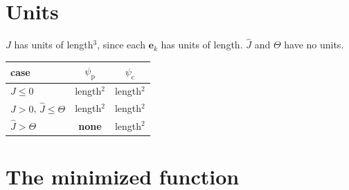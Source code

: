 \documentclass[11pt]{article}
\newcommand{\Jh}{\hat{J}}
\begin{document}
\section*{Units}

$J$ has units of length$^3$, since each $\mathbf{e}_k$ has units of length.
$\Jh$ and $\Theta$ have no units.

\begin{center}
\begin{tabular}{lcc}
  \toprule
  case & $\psi_{\mathrm{p}}$ & $\psi_{\mathrm{c}}$ \\
  \midrule
  $J \le 0$ & length$^2$ & length$^2$ \\
  $J > 0$, $\Jh \le \Theta$ & length$^2$ & length$^2$ \\
  $\Jh > \Theta$ & \textbf{none} & length$^2$ \\
  \bottomrule
\end{tabular}
\end{center}

\section*{The minimized function}
\end{document}
